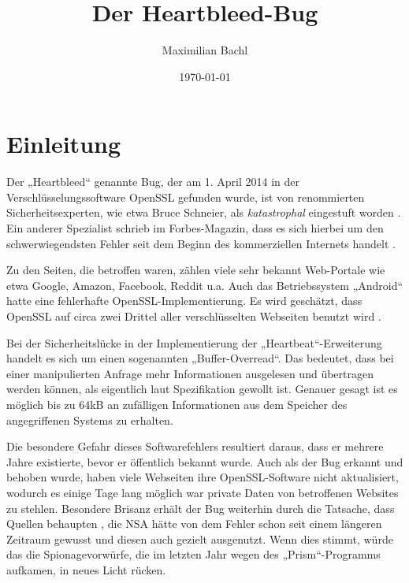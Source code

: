 \documentclass[12pt]{article}
\title{Der Heartbleed-Bug}
\author{Maximilian Bachl}
\begin{document}
\date{\today}

\maketitle


\section{Einleitung}

Der „Heartbleed“ genannte Bug, der am 1. April 2014 in der Verschlüsselungssoftware OpenSSL gefunden wurde, ist von renommierten Sicherheitsexperten, wie etwa Bruce Schneier, als \textit{katastrophal} eingestuft worden \citep{bruce_schneier_heartbleed_2014}. Ein anderer Spezialist schrieb im Forbes-Magazin, dass es sich hierbei um den schwerwiegendsten Fehler seit dem Beginn des kommerziellen Internets handelt \citep{joseph_steinberg_massive_2014}. 

Zu den Seiten, die betroffen waren, zählen viele sehr bekannt Web-Portale wie etwa Google, Amazon, Facebook, Reddit u.a. Auch das Betriebssystem „Android“ hatte eine fehlerhafte OpenSSL-Implementierung. Es wird geschätzt, dass OpenSSL auf circa zwei Drittel aller verschlüsselten Webseiten benutzt wird \citep{netcraft_april_2014}. 

Bei der Sicherheitslücke in der Implementierung der „Heartbeat“-Erweiterung \citep{limer_how_2014} handelt es sich um einen sogenannten „Buffer-Overread“. Das bedeutet, dass bei einer manipulierten Anfrage mehr Informationen ausgelesen und übertragen werden können, als eigentlich laut Spezifikation gewollt ist. Genauer gesagt ist es möglich bis zu 64kB an zufälligen Informationen aus dem Speicher des angegriffenen Systems zu erhalten. 

Die besondere Gefahr dieses Softwarefehlers resultiert daraus, dass er mehrere Jahre existierte, bevor er öffentlich bekannt wurde. Auch als der Bug erkannt und behoben wurde, haben viele Webseiten ihre OpenSSL-Software nicht aktualisiert, wodurch es einige Tage lang möglich war private Daten von betroffenen Websites zu stehlen.
Besondere Brisanz erhält der Bug weiterhin durch die Tatsache, dass Quellen behaupten \citep{riley_nsa_2014}, die NSA hätte von dem Fehler schon seit einem längeren Zeitraum gewusst und diesen auch gezielt ausgenutzt. Wenn dies stimmt, würde das die Spionagevorwürfe, die im letzten Jahr wegen des „Prism“-Programms aufkamen, in neues Licht rücken.
\end{document}
